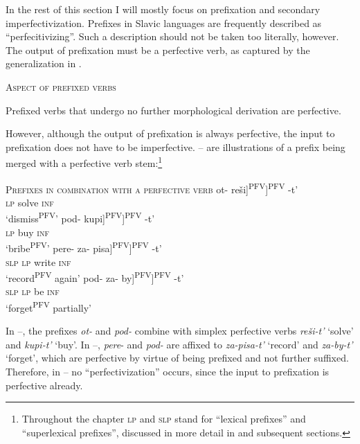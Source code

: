 \documentclass[output=paper,colorlinks,citecolor=brown]{langscibook}
\begin{document}
In the rest of this section I will mostly focus on prefixation and secondary imperfectivization. Prefixes in Slavic languages are frequently described as “perfecitivizing”. Such a description should not be taken too literally, however. The output of prefixation must be a perfective verb, as captured by the generalization in . 

\eanoraggedright   \textsc{Aspect of prefixed verbs}\label{tat:ex:11}

  Prefixed verbs that undergo no further morphological derivation are perfective.
\z

\noindent However, although the output of prefixation is always perfective, the input to prefixation does not have to be imperfective. -- are illustrations of a prefix being merged with a perfective verb stem:\footnote{Throughout the chapter \textsc{lp} and \textsc{slp} stand for ``lexical prefixes'' and ``superlexical prefixes'', discussed in more detail in  and subsequent sections.}

\ea   \textsc{Prefixes in combination with a perfective verb}\label{tat:ex:12}
\ea \gll \minsp{[} ot- \minsp{[} reši]\textsuperscript{PFV}]\textsuperscript{PFV} -t’  \\
{} \textsc{lp} {} solve \textsc{inf}\\
\glt  ‘dismiss\textsuperscript{PFV}’  \label{ex:tatevosov:12a}
\ex  \gll \minsp{[} pod- \minsp{[} kupi]\textsuperscript{PFV}]\textsuperscript{PFV}{} -t’  \\  
{} \textsc{lp} {} buy \textsc{inf}\\
\glt  ‘bribe\textsuperscript{PFV}’ \label{ex:tatevosov:12b}
\ex \gll \minsp{[} pere- \minsp{[} za- pisa]\textsuperscript{PFV}]\textsuperscript{PFV} -t’ \\
{} \textsc{slp} {} \textsc{lp} write \textsc{inf}   \\
\glt  ‘record\textsuperscript{PFV} again’\label{ex:tatevosov:12c}
\ex \gll   \minsp{[} pod- \minsp{[} za- by]\textsuperscript{PFV}]\textsuperscript{PFV} -t’\\
    {} \textsc{slp} {} \textsc{lp} be \textsc{inf}\\
\glt   ‘forget\textsuperscript{PFV} partially’\label{ex:tatevosov:12d}
\z
\z

\noindent In --, the prefixes \textit{ot-} and \textit{pod-} combine with simplex perfective verbs \textit{reši-t’} ‘solve’ and \textit{kupi-t’} ‘buy’. In --, \textit{pere}- and \textit{pod-} are affixed to \textit{za-pisa-t’} ‘record’ and \textit{za-by-t’} ‘forget’, which are perfective by virtue of being prefixed and not further suffixed. Therefore, in -- no “perfectivization” occurs, since the input to prefixation is perfective already.
\end{document}
